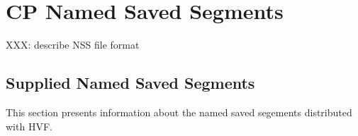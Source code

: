 \chapter{CP Named Saved Segments}
XXX: describe NSS file format

\section{Supplied Named Saved Segments}
This section presents information about the named saved segements
distributed with HVF.


